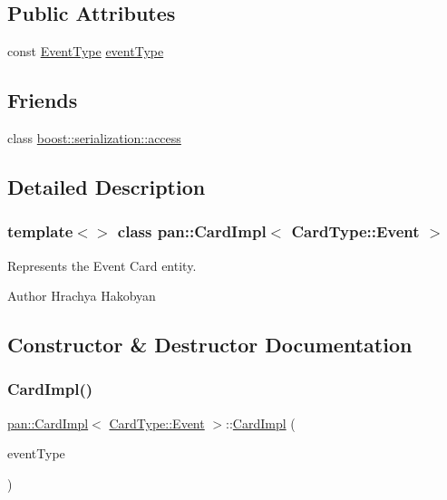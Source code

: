 \subsection*{Public Attributes}
\begin{DoxyCompactItemize}
\item 
const \hyperlink{namespacepan_a9221a73b34e019e6b8fe6f84e6417513}{Event\+Type} \hyperlink{classpan_1_1_card_impl_3_01_card_type_1_1_event_01_4_a575f1457eebafca8f0c975bdec2258e2}{event\+Type}
\end{DoxyCompactItemize}
\subsection*{Friends}
\begin{DoxyCompactItemize}
\item 
class \hyperlink{classpan_1_1_card_impl_3_01_card_type_1_1_event_01_4_ac98d07dd8f7b70e16ccb9a01abf56b9c}{boost\+::serialization\+::access}
\end{DoxyCompactItemize}


\subsection{Detailed Description}
\subsubsection*{template$<$$>$\newline
class pan\+::\+Card\+Impl$<$ Card\+Type\+::\+Event $>$}

Represents the Event Card entity. 

\begin{DoxyAuthor}{Author}
Hrachya Hakobyan 
\end{DoxyAuthor}


\subsection{Constructor \& Destructor Documentation}
\mbox{\label{classpan_1_1_card_impl_3_01_card_type_1_1_event_01_4_ad31a4637fd5d1c1c2aac120109b3c4e8}} 
\subsubsection{\texorpdfstring{Card\+Impl()}{CardImpl()}}
{\footnotesize\ttfamily \hyperlink{classpan_1_1_card_impl}{pan\+::\+Card\+Impl}$<$ \hyperlink{namespacepan_a1f7350bfd0421afeabe9fa95c16fa811aa4ecfc70574394990cf17bd83df499f7}{Card\+Type\+::\+Event} $>$\+::\hyperlink{classpan_1_1_card_impl}{Card\+Impl} (\begin{DoxyParamCaption}\item[{\hyperlink{namespacepan_a9221a73b34e019e6b8fe6f84e6417513}{Event\+Type}}]{event\+Type }\end{DoxyParamCaption})}

